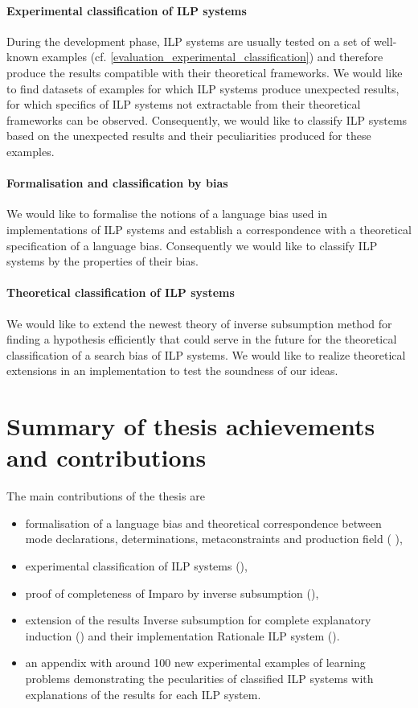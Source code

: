 \paragraph{Experimental classification of ILP systems}
During the development phase, ILP systems are usually tested on a set of well-known examples (cf. \ref{evaluation_experimental_classification}) and therefore produce the results compatible with their theoretical frameworks.
We would like to find datasets of examples for which ILP systems produce
unexpected results, for which specifics of ILP systems not extractable from their theoretical frameworks can be observed. Consequently, we would like to classify ILP systems based on the unexpected results and their peculiarities produced for these examples.
\paragraph{Formalisation and classification by bias}
We would like to formalise the notions of a language bias used in implementations of ILP systems and establish a correspondence with a theoretical specification of a language bias. Consequently we would like to classify ILP systems by the properties of their bias.
\paragraph{Theoretical classification of ILP systems}
We would like to extend the newest theory of inverse subsumption method for finding a hypothesis efficiently that could serve in the future for the theoretical classification of a search bias of ILP systems. We would like to realize theoretical extensions in an implementation to test the soundness of our ideas.

\section{Summary of thesis achievements and contributions}
The main contributions of the thesis are
\begin{itemize}
\item formalisation of a language bias and theoretical correspondence between mode declarations, determinations, metaconstraints and production field ( ),
\item experimental classification of ILP systems (),
\item proof of completeness of Imparo by inverse subsumption (),
\item extension of the results Inverse subsumption for complete explanatory induction () and their implementation Rationale ILP system ().
\item an appendix with around 100 new experimental examples of learning problems demonstrating the pecularities of classified ILP systems with explanations of the results for each ILP system.
\end{itemize}

